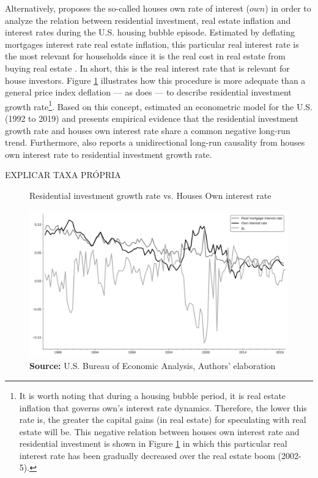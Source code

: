 \documentclass[11pt]{article}
\begin{document}
Alternatively, \textcite{teixeira_crescimento_2015} proposes the so-called houses own rate of interest (\(own\)) in order to analyze the relation between residential investment, real estate inflation and interest rates during the U.S. housing bubble episode.
Estimated by deflating mortgages interest rate real estate inflation, this particular real interest rate is the most relevant for households since it is the real cost in real estate from buying real estate  \cite[p.~53]{teixeira_crescimento_2015}.
In short, this is the real interest rate that is relevant for house investors.
Figure \ref{propria_investo} illustrates how this  procedure is more adequate than a general price index deflation --- as \textcite[p.~143--6]{fair_macroeconometric_2013} does --- to describe residential investment growth rate\footnote{It is worth noting that during a housing bubble period, it is real estate inflation that governs own's interest rate dynamics. Therefore, the lower this rate is, the greater the capital gains (in real estate) for speculating with real estate will be. This negative relation between houses own interest rate and residential investment is shown in Figure \ref{propria_investo} in which this particular real interest rate has been gradually decreased over the real estate boom (2002-5).}.
Based on this concept, \textcite{petrini_demanda_2019} estimated an econometric model for the U.S. (1992 to 2019) and presents empirical evidence that the residential investment growth rate and houses own interest rate share a common negative long-run trend.
Furthermore, \textcite{petrini_demanda_2019} also reports a unidirectional long-run causality from houses own interest rate to residential investment growth rate.

EXPLICAR TAXA PRÓPRIA


\begin{figure}[htb]
	\centering
	\caption{Residential investment growth rate vs. Houses Own interest rate}
	\label{propria_investo}
	\includegraphics[width=.8\textwidth]{./figs/Own_gI}
	\caption*{\textbf{Source:} U.S. Bureau of Economic Analysis, Authors' elaboration}
\end{figure}
\end{document}
